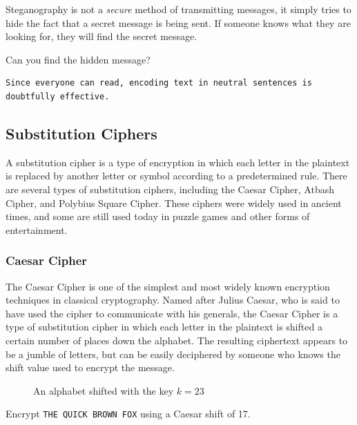 \documentclass[11pt,a4paper]{report}
\begin{document}
Steganography is not a \emph{secure} method of transmitting messages, it simply tries to hide the fact that a secret message is being sent.
If someone knows what they are looking for, they will find the secret message.

\begin{ex}
Can you find the hidden message?
\begin{verbatim}
Since everyone can read, encoding text in neutral sentences is
doubtfully effective.
\end{verbatim}
\end{ex}

\subsection{Substitution Ciphers}

A substitution cipher is a type of encryption in which each letter in the plaintext is replaced by another letter or symbol according to a predetermined rule.
There are several types of substitution ciphers, including the Caesar Cipher, Atbash Cipher, and Polybius Square Cipher.
These ciphers were widely used in ancient times, and some are still used today in puzzle games and other forms of entertainment.
\subsubsection{Caesar Cipher}
The Caesar Cipher is one of the simplest and most widely known encryption techniques in classical cryptography.
Named after Julius Caesar, who is said to have used the cipher to communicate with his generals, the Caesar Cipher is a type of substitution cipher in which each letter in the plaintext is shifted a certain number of places down the alphabet.
The resulting ciphertext appears to be a jumble of letters, but can be easily deciphered by someone who knows the shift value used to encrypt the message.
\begin{figure}[h]
\caption{An alphabet shifted with the key $k=23$}
\end{figure}

\begin{ex}
Encrypt \verb|THE QUICK BROWN FOX|
using a Caesar shift of 17.
\end{ex}
\end{document}
